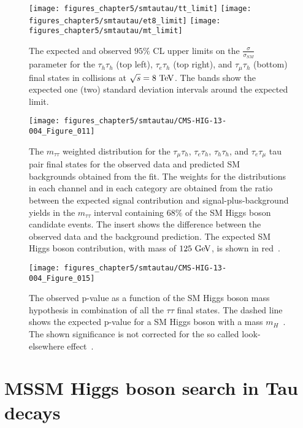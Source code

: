 \begin{figure}[htbp]
\centering
\texttt{[image: figures\_chapter5/smtautau/tt\_limit]}
\texttt{[image: figures\_chapter5/smtautau/et8\_limit]}
\texttt{[image: figures\_chapter5/smtautau/mt\_limit]}
\caption{The expected and observed $95\%$ CL upper limits on the $\frac{\sigma}{\sigma_{SM}}$ parameter for the $\tau_{h}\tau_{h}$ (top left), $\tau_{e}\tau_{h}$ (top right), and $\tau_{\mu}\tau_{h}$ (bottom) final states in collisions at $\sqrt{s}=8~\mathrm{Te\kern -0.1em V}$. The bands show the expected one (two) standard deviation intervals around the expected limit.}
\label{fig:ind}
\end{figure}

\begin{figure}[htbp]
\centering
\texttt{[image: figures\_chapter5/smtautau/CMS-HIG-13-004\_Figure\_011]}
\caption{The $m_{\tau\tau}$ weighted distribution for the $\tau_{\mu}\tau_{h}$, $\tau_{e}\tau_{h}$, $\tau_{h}\tau_{h}$, and  $\tau_{e}\tau_{\mu}$ tau pair final states for the observed data and predicted SM backgrounds obtained from the fit. The weights for the distributions in each channel and in each category are obtained from the ratio between the expected signal contribution and signal-plus-background yields in the $m_{\tau\tau}$ interval containing $68\%$ of the SM Higgs boson candidate events. The insert shows the difference between the observed data and the background prediction. The expected SM Higgs boson contribution, with mass of $125~\mathrm{Ge\kern -0.1em V}$, is shown in red~\cite{Chatrchyan:2014nva}.}
\label{fig:mass_plot}
\end{figure}


\begin{figure}[htbp]
\centering
\texttt{[image: figures\_chapter5/smtautau/CMS-HIG-13-004\_Figure\_015]}
\caption{The observed p-value as a function of the SM Higgs boson mass hypothesis in combination of all the $\tau\tau$ final states. The dashed line shows the expected p-value for a SM Higgs boson with a mass $m_{H}$~\cite{Chatrchyan:2014nva}. The shown significance is not corrected for the so called look-elsewhere effect~\cite{loook}.}
\label{fig:money}
\end{figure}

\section{MSSM Higgs boson search in Tau decays}

